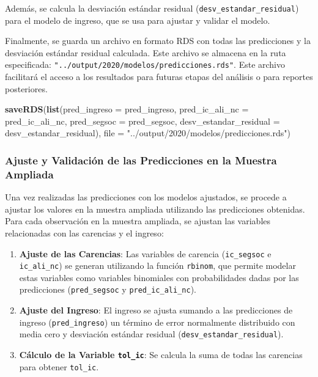 \documentclass[
  12pt,
]{book}
\newenvironment{Shaded}{\begin{snugshade}}{\end{snugshade}}
\newcommand{\AttributeTok}[1]{\textcolor[rgb]{0.13,0.29,0.53}{#1}}
\newcommand{\FunctionTok}[1]{\textcolor[rgb]{0.13,0.29,0.53}{\textbf{#1}}}
\newcommand{\NormalTok}[1]{#1}
\newcommand{\StringTok}[1]{\textcolor[rgb]{0.31,0.60,0.02}{#1}}
\begin{document}
Además, se calcula la desviación estándar residual (\texttt{desv\_estandar\_residual}) para el modelo de ingreso, que se usa para ajustar y validar el modelo.

Finalmente, se guarda un archivo en formato RDS con todas las predicciones y la desviación estándar residual calculada. Este archivo se almacena en la ruta especificada: \texttt{"../output/2020/modelos/predicciones.rds"}. Este archivo facilitará el acceso a los resultados para futuras etapas del análisis o para reportes posteriores.

\begin{Shaded}
\begin{Highlighting}[]
\FunctionTok{saveRDS}\NormalTok{(}\FunctionTok{list}\NormalTok{(}\AttributeTok{pred\_ingreso =}\NormalTok{ pred\_ingreso, }
          \AttributeTok{pred\_ic\_ali\_nc =}\NormalTok{ pred\_ic\_ali\_nc, }
          \AttributeTok{pred\_segsoc =}\NormalTok{ pred\_segsoc, }
          \AttributeTok{desv\_estandar\_residual =}\NormalTok{ desv\_estandar\_residual),}
     \AttributeTok{file =}  \StringTok{"../output/2020/modelos/predicciones.rds"}\NormalTok{)}
\end{Highlighting}
\end{Shaded}

\hypertarget{ajuste-y-validaciuxf3n-de-las-predicciones-en-la-muestra-ampliada}{%
\subsubsection*{Ajuste y Validación de las Predicciones en la Muestra Ampliada}\label{ajuste-y-validaciuxf3n-de-las-predicciones-en-la-muestra-ampliada}}

Una vez realizadas las predicciones con los modelos ajustados, se procede a ajustar los valores en la muestra ampliada utilizando las predicciones obtenidas. Para cada observación en la muestra ampliada, se ajustan las variables relacionadas con las carencias y el ingreso:

\begin{enumerate}
\def\labelenumi{\arabic{enumi}.}
\item
  \textbf{Ajuste de las Carencias}: Las variables de carencia (\texttt{ic\_segsoc} e \texttt{ic\_ali\_nc}) se generan utilizando la función \texttt{rbinom}, que permite modelar estas variables como variables binomiales con probabilidades dadas por las predicciones (\texttt{pred\_segsoc} y \texttt{pred\_ic\_ali\_nc}).
\item
  \textbf{Ajuste del Ingreso}: El ingreso se ajusta sumando a las predicciones de ingreso (\texttt{pred\_ingreso}) un término de error normalmente distribuido con media cero y desviación estándar residual (\texttt{desv\_estandar\_residual}).
\item
  \textbf{Cálculo de la Variable \texttt{tol\_ic}}: Se calcula la suma de todas las carencias para obtener \texttt{tol\_ic}.
\end{enumerate}
\end{document}
